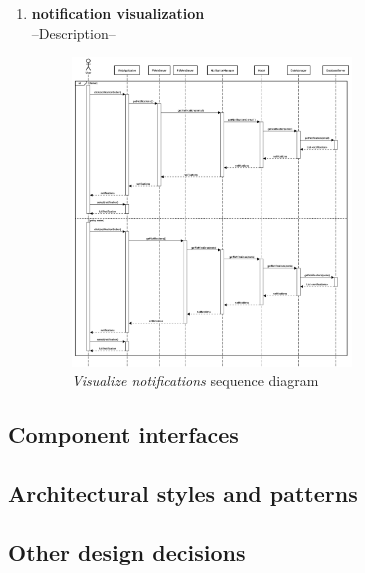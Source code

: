 \begin{enumerate}
    \item \textbf{notification visualization}\\
    --Description--
    \begin{figure}[H]
        \begin{center}
        \includegraphics[width=0.7\textwidth]{sequance/viewNotifications.png}
        \caption{\emph{Visualize notifications} sequence diagram}
        \label{fig:sequence9}
        \end{center}
    \end{figure}
    
\end{enumerate}

\subsection{Component interfaces}



\subsection{Architectural styles and patterns}

\subsection{Other design decisions}

